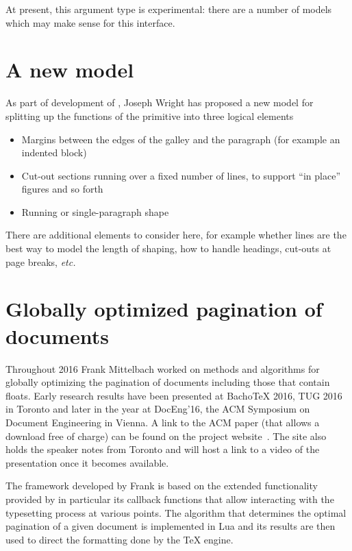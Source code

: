 \documentclass{ltnews}
\begin{document}
At present, this argument type is experimental: there are a number of models
which may make sense for this interface.

\section{A new  model}

As part of development of , Joseph Wright has proposed a new
model for splitting up the functions of the  primitive into three
logical elements
\begin{itemize}
  \item Margins between the edges of the galley and the paragraph (for example
    an indented block)
  \item Cut-out sections running over a fixed number of lines, to support
    \enquote{in place} figures and so forth
  \item Running or single-paragraph shape
\end{itemize}

There are additional elements to consider here, for example whether lines are
the best way to model the length of shaping, how to handle headings, cut-outs
at page breaks, \emph{etc.}


\section{Globally optimized pagination of documents}

Throughout 2016 Frank Mittelbach worked on methods and algorithms for
globally optimizing the pagination of documents including those that
contain floats. Early research results have been presented at Bacho\TeX{}
2016, TUG 2016 in Toronto and later in the year at \mbox{DocEng'16}, the ACM
Symposium on Document Engineering in Vienna. A link to the ACM paper
(that allows a download free of charge) can be found on the project
website~\cite{project-publications}. The site also holds the speaker
notes from Toronto and will host a link to a video of the
presentation once it becomes available.

The framework developed by Frank is based on the extended
functionality provided by  in particular its callback
functions that allow interacting with the typesetting process at
various points. The algorithm that determines the optimal pagination
of a given document is implemented in {Lua} and its results are then
used to direct the formatting done by the \TeX{} engine.
\end{document}
